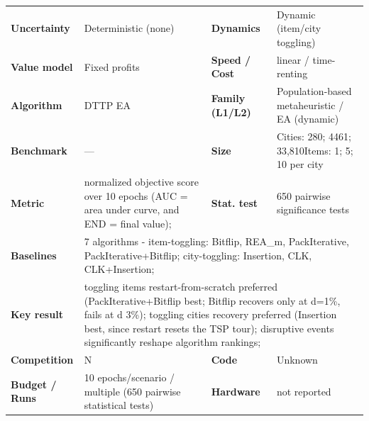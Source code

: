 \documentclass[
  a4paper,
  11pt,
  headings=small,
  numbers=noenddot,
  abstract=on,
  parskip=half,
]{scrartcl}
\begin{document}
\begin{landscape}
\begin{longtable}{@{}p{2.6cm}p{8.7cm}p{2.6cm}p{8.7cm}@{}}
\textbf{Uncertainty} & Deterministic (none) & \textbf{Dynamics} & Dynamic (item/city toggling) \\
\textbf{Value model} & Fixed profits & \textbf{Speed / Cost} & linear / time-renting \\
\textbf{Algorithm} & DTTP EA & \textbf{Family (L1/L2)} & Population-based metaheuristic / EA (dynamic) \\
\textbf{Benchmark} & --- & \textbf{Size} & Cities: 280; 4461; 33,810\newline Items: 1; 5; 10 per city \\
\textbf{Metric} & normalized objective score over 10 epochs (AUC = area under curve, and END = final value); & \textbf{Stat. test} & 650 pairwise significance tests \\
\textbf{Baselines} & \multicolumn{3}{p{20.0cm}}{7 algorithms - item-toggling: Bitflip, REA\_m, PackIterative, PackIterative+Bitflip; city-toggling: Insertion, CLK, CLK+Insertion;} \\
\textbf{Key result} & \multicolumn{3}{p{20.0cm}}{toggling items restart-from-scratch preferred (PackIterative+Bitflip best; Bitflip recovers only at d=1\%, fails at d 3\%); toggling cities recovery preferred (Insertion best, since restart resets the TSP tour); disruptive events significantly reshape algorithm rankings;} \\
\textbf{Competition} & N & \textbf{Code} & Unknown \\
\textbf{Budget / Runs} & 10 epochs/scenario / multiple (650 pairwise statistical tests) & \textbf{Hardware} & not reported \\

\end{longtable}
\end{landscape}
\end{document}
